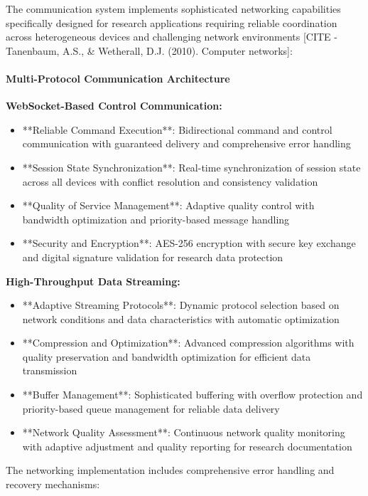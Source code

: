 \documentclass[12pt,a4paper]{article}
\begin{document}
The communication system implements sophisticated networking capabilities specifically designed for research
applications requiring reliable coordination across heterogeneous devices and challenging network
environments [CITE - Tanenbaum, A.S., \& Wetherall, D.J. (2010). Computer networks]:

\paragraph{Multi-Protocol Communication Architecture}

\textbf{WebSocket-Based Control Communication:}

\begin{itemize}
\item **Reliable Command Execution**: Bidirectional command and control communication with guaranteed delivery and
  comprehensive error handling
\item **Session State Synchronization**: Real-time synchronization of session state across all devices with conflict
  resolution and consistency validation
\item **Quality of Service Management**: Adaptive quality control with bandwidth optimization and priority-based message
  handling
\item **Security and Encryption**: AES-256 encryption with secure key exchange and digital signature validation for research
  data protection

\end{itemize}
\textbf{High-Throughput Data Streaming:}

\begin{itemize}
\item **Adaptive Streaming Protocols**: Dynamic protocol selection based on network conditions and data characteristics with
  automatic optimization
\item **Compression and Optimization**: Advanced compression algorithms with quality preservation and bandwidth optimization
  for efficient data transmission
\item **Buffer Management**: Sophisticated buffering with overflow protection and priority-based queue management for
  reliable data delivery
\item **Network Quality Assessment**: Continuous network quality monitoring with adaptive adjustment and quality reporting
  for research documentation

\end{itemize}
The networking implementation includes comprehensive error handling and recovery mechanisms:
\end{document}

